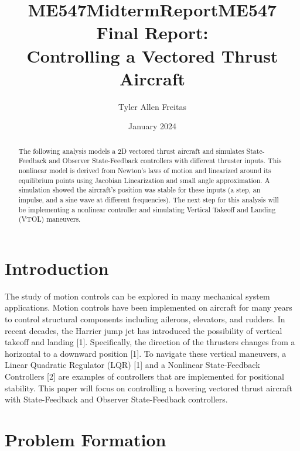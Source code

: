 \documentclass[conference]{IEEEtran}
\begin{document}
\title{ME547MidtermReport}
\author{Tyler Allen Freitas}
\date{January 2024}

\title{ME547 Final Report: \\ Controlling a Vectored Thrust Aircraft}

\author{
}

\maketitle
\begin{abstract}
The following analysis models a 2D vectored thrust aircraft and simulates State-Feedback and Observer State-Feedback controllers with different thruster inputs. This nonlinear model is derived from Newton's laws of motion and linearized around its equilibrium points using Jacobian Linearization and small angle approximation. A simulation showed the aircraft's position was stable for these inputs (a step, an impulse, and a sine wave at different frequencies). The next step for this analysis will be implementing a nonlinear controller and simulating Vertical Takeoff and Landing (VTOL) maneuvers.
\end{abstract}

\section{Introduction}
The study of motion controls can be explored in many mechanical system applications. Motion controls have been implemented on aircraft for many years to control structural components including ailerons, elevators, and rudders. In recent decades, the Harrier jump jet has introduced the possibility of vertical takeoff and landing [1]. Specifically, the direction of the thrusters changes from a horizontal to a downward position [1]. To navigate these vertical maneuvers, a Linear Quadratic Regulator (LQR) [1] and a Nonlinear State-Feedback Controllers [2] are examples of controllers that are implemented for positional stability. This paper will focus on controlling a hovering vectored thrust aircraft with State-Feedback and Observer State-Feedback controllers.  

\section{Problem Formation}
\end{document}
